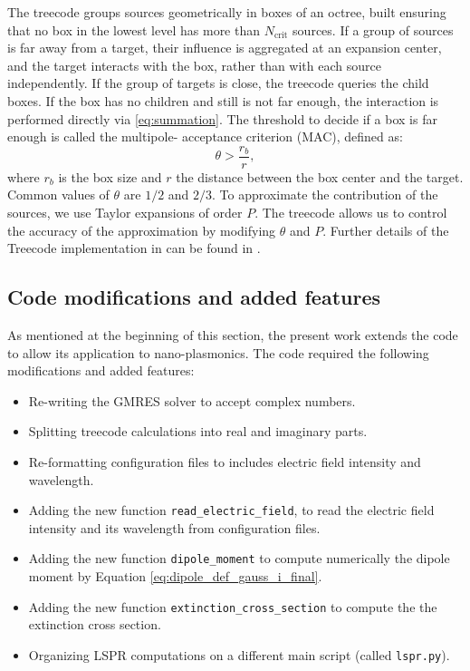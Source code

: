 The treecode groups sources geometrically in boxes of an octree, built ensuring
that no box in the lowest level has more than $N_\text{crit}$ sources. If a group of
sources is far away from a target, their influence is aggregated at an expansion center,
and the target interacts with the box, rather than with each source independently.
If the group of targets is  close, the treecode queries the child
boxes. If the box has no children and still is not far enough, the interaction is 
performed directly via \eqref{eq:summation}.
 The threshold to decide if a box is far enough is called the multipole-
acceptance criterion (MAC), defined as:
%
\begin{equation}
\theta > \frac{r_b}{r},
\end{equation}
%
\noindent where $r_b$ is the box size and $r$ the distance between the box center and the target.
Common values of $\theta$ are $1/2$ and $2/3$.
To approximate the contribution of the sources, we use Taylor expansions
of order $P$.
The treecode allows us to control the accuracy of the approximation by modifying $\theta$ and $P$.
Further details of the Treecode implementation in \pygbe can be found in \cite{CooperBarba-share154331,CooperBardhanBarba2013}.

\subsection{Code modifications and added features} \label{sec:code_imp}

As mentioned at the beginning of this section, the present work extends the \pygbe code
to allow its application to nano-plasmonics. 
The code required the following modifications and added features:

\begin{itemize}
    \item Re-writing the GMRES solver to accept complex numbers. 
    \item Splitting treecode calculations into real and imaginary parts.
    \item Re-formatting configuration files to includes electric field intensity and  wavelength.
    \item Adding the new function \texttt{read\_electric\_field}, to read the electric field intensity and its wavelength from configuration files.
    \item Adding the new function \texttt{dipole\_moment} to compute numerically the dipole moment by Equation \eqref{eq:dipole_def_gauss_i_final}.
    \item Adding the new function \texttt{extinction\_cross\_section} to compute the the extinction cross section.
    \item Organizing LSPR computations on a different main script (called \texttt{lspr.py}).
\end{itemize}

